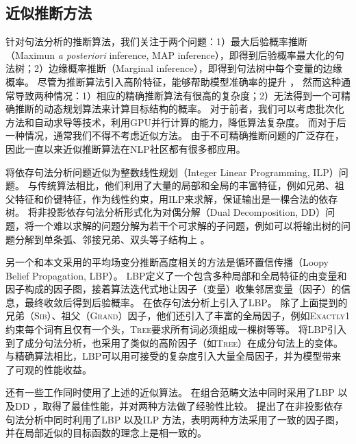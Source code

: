\subsection{近似推断方法}
针对句法分析的推断算法，我们关注于两个问题：1）最大后验概率推断（Maximun \textit{a posteriori} inference, MAP inference），即得到后验概率最大化的句法树；2）边缘概率推断（Marginal inference），即得到句法树中每个变量的边缘概率。
尽管为推断算法引入高阶特征，能够帮助模型准确率的提升 \citep{mcdonald-pereira-2006-online,carreras-2007-experiments,koo-collins-2010-efficient,ma-zhao-2012-fourth}，
然而这种通常导致两种情况：1）相应的精确推断算法有很高的复杂度；2）无法得到一个可精确推断的动态规划算法来计算目标结构的概率。
对于前者，我们可以考虑批次化方法和自动求导等技术，利用GPU并行计算的能力，降低算法复杂度。
而对于后一种情况，通常我们不得不考虑近似方法。
由于不可精确推断问题的广泛存在，因此一直以来近似推断算法在NLP社区都有很多都应用。

\citet{martins-etal-2009-concise}将依存句法分析问题近似为整数线性规划（Integer Linear Programming, ILP）问题。
与传统算法相比，他们利用了大量的局部和全局的丰富特征，例如兄弟、祖父特征和价键特征，作为线性约束，用ILP来求解，保证输出是一棵合法的依存树。
\citet{koo-etal-2010-dual}将非投影依存句法分析形式化为对偶分解（Dual Decomposition, DD）问题，将一个难以求解的问题分解为若干个可求解的子问题，例如可以将输出树的问题分解到单条弧、邻接兄弟、双头等子结构上 \citep{martins-etal-2011-dual}。

另一个和本文采用的平均场变分推断高度相关的方法是循环置信传播（Loopy Belief Propagation, LBP）。
LBP定义了一个包含多种局部和全局特征的由变量和因子构成的因子图，接着算法迭代式地让因子（变量）收集邻居变量（因子）的信息，最终收敛后得到后验概率。
\citet{smith-eisner-2008-dependency,gormley-etal-2015-approximation}在依存句法分析上引入了LBP。
除了上面提到的兄弟（\textsc{Sib}）、祖父（\textsc{Grand}）因子，他们还引入了丰富的全局因子，例如\textsc{Exactly1}约束每个词有且仅有一个头，\textsc{Tree}要求所有词必须组成一棵树等等。
\citet{naradowsky-etal-2012-grammarless}将LBP引入到了成分句法分析，也采用了类似的高阶因子（如\textsc{Tree}）在成分句法上的变体。
与精确算法相比，LBP可以用可接受的复杂度引入大量全局因子，并为模型带来了可观的性能收益。

还有一些工作同时使用了上述的近似算法。
\citet{auli-lopez-2011-comparison}在组合范畴文法中同时采用了LBP \citep{smith-eisner-2008-dependency}以及DD \citep{koo-etal-2010-dual}，取得了最佳性能，并对两种方法做了经验性比较。
\citet{martins-etal-2010-turbo}提出了在非投影依存句法分析中同时利用了LBP \citep{smith-eisner-2008-dependency}以及ILP \citep{martins-etal-2009-concise}方法，表明两种方法采用了一致的因子图，并在局部近似的目标函数的理念上是相一致的。


